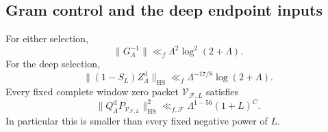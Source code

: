 \subsection{Gram control and the deep endpoint inputs}

\begin{proposition}\label{hnew:gram-deep}
For either selection,
\begin{equation}\label{hnew:gram-bound}
 \|G_\Lambda^{-1}\|\ll_f\Lambda^2\log^2(2+\Lambda).
\end{equation}
For the deep selection,
\begin{equation}\label{hnew:deep-leakage}
 \|(1-S_L)Z_\Lambda^{\mathrm d}\|_{\mathrm{HS}}
                       \ll_f\Lambda^{-17/8}\log(2+\Lambda).
\end{equation}
Every fixed complete window zero packet $\mathcal V_{\mathcal F,L}$
satisfies
\begin{equation}\label{hnew:deep-packets}
 \|Q_\Lambda^{\mathrm d}P_{\mathcal V_{\mathcal F,L}}\|_{\mathrm{HS}}^2
            \ll_{f,\mathcal F}\Lambda^{1-56}(1+L)^C.
\end{equation}
In particular this is smaller than every fixed negative power of $L$.
\end{proposition}
